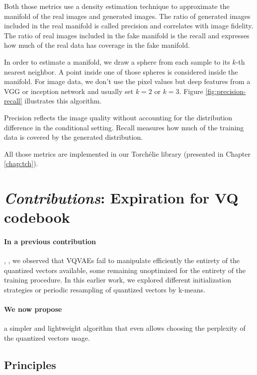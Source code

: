 Both those metrics use a density estimation technique to approximate the manifold of the real images and generated images. The ratio of generated images included in the real manifold is called precision and correlates with image fidelity. The ratio of real images included in the fake manifold is the recall and expresses how much of the real data has coverage in the fake manifold.

In order to estimate a manifold, we draw a sphere from each sample to its $k$-th nearest neighbor. A point inside one of those spheres is considered inside the manifold. For image data, we don't use the pixel values but deep features from a VGG or inception network and usually set $k=2$ or $k=3$. Figure \ref{fig:precision-recall} illustrates this algorithm.

Precision reflects the image quality without accounting for the distribution difference in the conditional setting. Recall measures how much of the training data is covered by the generated distribution.

All those metrics are implemented in our Torchélie library (presented in Chapter \ref{chap:tch}).

\section{\emph{\arr Contributions}: Expiration for \acf{VQ} codebook}
\label{sec:vqexpir}

\paragraph{In a previous contribution}, \citet{robustvq}, we observed that \acp{VQVAE} fail to manipulate efficiently the entirety of the quantized vectors available, some remaining unoptimized for the entirety of the training procedure. In this earlier work, we explored different initialization strategies or periodic resampling of quantized vectors by k-means.

\paragraph{We now propose} a simpler and lightweight algorithm that even allows choosing the perplexity of the quantized vectors usage.

\subsection{Principles}

